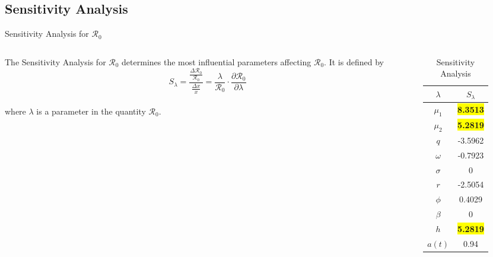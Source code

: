 \documentclass{beamer}
\begin{document}
\subsection{Sensitivity Analysis}
\begin{frame}{Sensitivity Analysis for $\mathscr{R}_0$}
    \begin{columns}
        \begin{column}{0.6\textwidth}
        \small
            The Sensitivity Analysis for $\mathscr{R}_0$ determines the most influential parameters affecting $\mathscr{R}_0$. It is defined by
                $$S_{\lambda} = \frac{\frac{\Delta \mathscr{R}_{0}}{\mathscr{R}_{0}}}{\frac{\Delta x}{x}} = \frac{\lambda}{\mathscr{R}_{0}} \cdot \frac{\partial \mathscr{R}_{0}}{\partial \lambda}$$ \\
                where $\lambda$ is a parameter in the quantity $\mathscr{R}_{0}$.
        \end{column}
        \begin{column}{0.4\textwidth}
            \begin{table}[H]
                \centering
                \begin{tabular}{|c|c|}
                \hline
                    $\lambda$ & $S_{\lambda}$ \\
                    \hline
                    \hline
                    $\mu_{1}$ & \colorbox{yellow}{\textbf{8.3513}}\\
                    \hline
                    $\mu_{2}$ & \colorbox{yellow}{\textbf{5.2819}}\\
                    \hline
                    $q$ & -3.5962\\
                    \hline
                    $\omega$ & -0.7923\\
                    \hline
                    $\sigma$ & 0\\
                    \hline
                    $r$ & -2.5054\\
                    \hline
                    $\phi$ & 0.4029\\
                    \hline
                    $\beta$ & 0\\
                    \hline
                    $h$ & \colorbox{yellow}{\textbf{5.2819}}\\
                    \hline
                    $a(t)$ & 0.94\\
                    \hline
                \end{tabular}
                \caption{Sensitivity Analysis}
                \label{tab:sens_analysis}
            \end{table}
        \end{column}
    \end{columns}
\end{frame}
\end{document}
